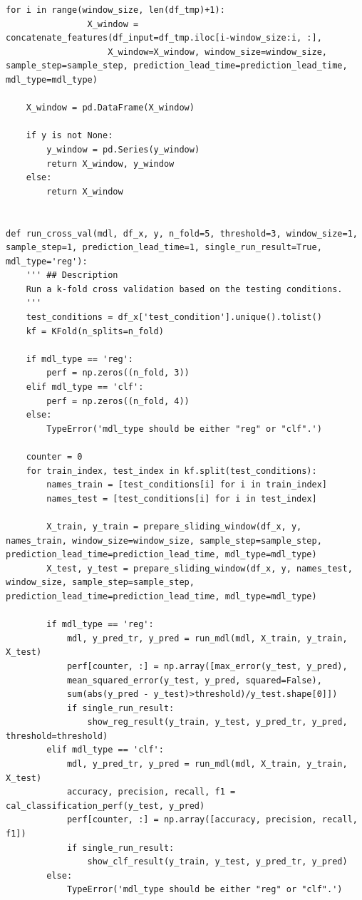\documentclass[11pt,a4paper]{article}
\begin{document}
\begin{lstlisting}[style=pyfull]
            for i in range(window_size, len(df_tmp)+1):
                X_window = concatenate_features(df_input=df_tmp.iloc[i-window_size:i, :],
                    X_window=X_window, window_size=window_size, sample_step=sample_step, prediction_lead_time=prediction_lead_time, mdl_type=mdl_type)

    X_window = pd.DataFrame(X_window)

    if y is not None:
        y_window = pd.Series(y_window)
        return X_window, y_window
    else:
        return X_window


def run_cross_val(mdl, df_x, y, n_fold=5, threshold=3, window_size=1, sample_step=1, prediction_lead_time=1, single_run_result=True, mdl_type='reg'):
    ''' ## Description
    Run a k-fold cross validation based on the testing conditions.
    '''
    test_conditions = df_x['test_condition'].unique().tolist()
    kf = KFold(n_splits=n_fold)

    if mdl_type == 'reg':
        perf = np.zeros((n_fold, 3))
    elif mdl_type == 'clf':
        perf = np.zeros((n_fold, 4))
    else:
        TypeError('mdl_type should be either "reg" or "clf".')

    counter = 0
    for train_index, test_index in kf.split(test_conditions):
        names_train = [test_conditions[i] for i in train_index]
        names_test = [test_conditions[i] for i in test_index]

        X_train, y_train = prepare_sliding_window(df_x, y, names_train, window_size=window_size, sample_step=sample_step, prediction_lead_time=prediction_lead_time, mdl_type=mdl_type)
        X_test, y_test = prepare_sliding_window(df_x, y, names_test, window_size, sample_step=sample_step, prediction_lead_time=prediction_lead_time, mdl_type=mdl_type)

        if mdl_type == 'reg':
            mdl, y_pred_tr, y_pred = run_mdl(mdl, X_train, y_train, X_test)
            perf[counter, :] = np.array([max_error(y_test, y_pred),
            mean_squared_error(y_test, y_pred, squared=False),
            sum(abs(y_pred - y_test)>threshold)/y_test.shape[0]])
            if single_run_result:
                show_reg_result(y_train, y_test, y_pred_tr, y_pred, threshold=threshold)
        elif mdl_type == 'clf':
            mdl, y_pred_tr, y_pred = run_mdl(mdl, X_train, y_train, X_test)
            accuracy, precision, recall, f1 = cal_classification_perf(y_test, y_pred)
            perf[counter, :] = np.array([accuracy, precision, recall, f1])
            if single_run_result:
                show_clf_result(y_train, y_test, y_pred_tr, y_pred)
        else:
            TypeError('mdl_type should be either "reg" or "clf".')


\end{lstlisting}
\end{document}
